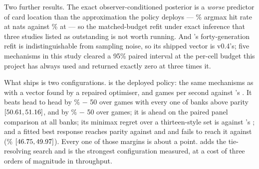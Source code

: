 Two further results. The exact observer-conditioned posterior is a \emph{worse} predictor of card
location than the approximation the policy deploys --- \vsixBeliefExactHit\% argmax hit rate at
\vsixBeliefExactNLL{} nats against \vsixBeliefShippedHit\% at \vsixBeliefShippedNLL{} --- so the
matched-budget refit under exact inference that three studies listed as outstanding is not worth
running. And \vfive{}'s forty-generation refit is indistinguishable from sampling noise, so its
shipped vector is v0.4's; five mechanisms in this study cleared a 95\% paired interval at the
per-cell budget this project has always used and returned exactly zero at three times it.

What ships is two configurations. \vsix{} is the deployed policy: the same mechanisms as \vfive{}
with a vector found by a repaired optimiser, and \vsixThroughputSix{} games per second against
\vfive{}'s \vsixThroughputFive{}. It beats \vfive{} head to head by \vsixBigFive\% $-$ 50 over
\vsixBigFiveN{} games with every one of \vsixBigFiveBanks{} banks above parity
$[50.61, 51.16]$, and \vfour{} by \vsixBigFour\% $-$ 50 over
\vsixBigFourN{} games; it is ahead on the paired panel comparison at all \vsixPairedBanks{} banks;
its minimax regret over a thirteen-style set is \vsixPoolRegretSix{} against \vfive{}'s
\vsixPoolRegretFive{}; and a fitted best response reaches parity against \vfour{} and \vfive{} and
fails to reach it against \vsix{} (\vsixLbrSix\% $[46.75, 49.97]$). Every one of
those margins is about a point. \vsixsearch{} adds the tie-resolving search and is the strongest
configuration measured, at a cost of three orders of magnitude in throughput.
